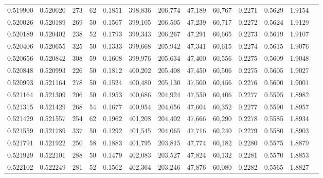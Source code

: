 \begin{tabular}{rrrrrrrrrrrrr}
0.519900 & 0.520020 &   273 &  62 &                                     0.1851 & 398,836 & 206,774 &  47,189 &  60,767 & 0.2271 & 0.5629 & 1.9154 \\
0.520026 & 0.520189 &   269 &  50 &                                     0.1567 & 399,105 & 206,505 &  47,239 &  60,717 & 0.2272 & 0.5624 & 1.9129 \\
0.520189 & 0.520402 &   238 &  52 &                                     0.1793 & 399,343 & 206,267 &  47,291 &  60,665 & 0.2273 & 0.5619 & 1.9107 \\
0.520406 & 0.520655 &   325 &  50 &                                     0.1333 & 399,668 & 205,942 &  47,341 &  60,615 & 0.2274 & 0.5615 & 1.9076 \\
0.520656 & 0.520842 &   308 &  59 &                                     0.1608 & 399,976 & 205,634 &  47,400 &  60,556 & 0.2275 & 0.5609 & 1.9048 \\
0.520848 & 0.520993 &   226 &  50 &                                     0.1812 & 400,202 & 205,408 &  47,450 &  60,506 & 0.2275 & 0.5605 & 1.9027 \\
0.520993 & 0.521164 &   278 &  50 &                                     0.1524 & 400,480 & 205,130 &  47,500 &  60,456 & 0.2276 & 0.5600 & 1.9001 \\
0.521164 & 0.521309 &   206 &  50 &                                     0.1953 & 400,686 & 204,924 &  47,550 &  60,406 & 0.2277 & 0.5595 & 1.8982 \\
0.521315 & 0.521429 &   268 &  54 &                                     0.1677 & 400,954 & 204,656 &  47,604 &  60,352 & 0.2277 & 0.5590 & 1.8957 \\
0.521429 & 0.521557 &   254 &  62 &                                     0.1962 & 401,208 & 204,402 &  47,666 &  60,290 & 0.2278 & 0.5585 & 1.8934 \\
0.521559 & 0.521789 &   337 &  50 &                                     0.1292 & 401,545 & 204,065 &  47,716 &  60,240 & 0.2279 & 0.5580 & 1.8903 \\
0.521791 & 0.521922 &   250 &  58 &                                     0.1883 & 401,795 & 203,815 &  47,774 &  60,182 & 0.2280 & 0.5575 & 1.8879 \\
0.521929 & 0.522101 &   288 &  50 &                                     0.1479 & 402,083 & 203,527 &  47,824 &  60,132 & 0.2281 & 0.5570 & 1.8853 \\
0.522102 & 0.522249 &   281 &  52 &                                     0.1562 & 402,364 & 203,246 &  47,876 &  60,080 & 0.2282 & 0.5565 & 1.8827 \\

\end{tabular}
